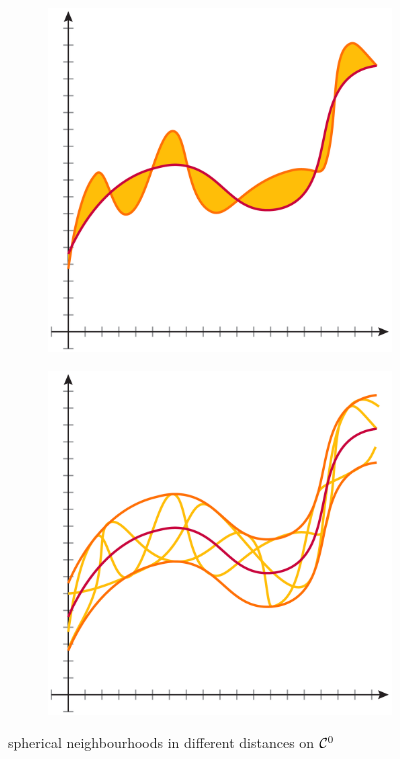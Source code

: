 \begin{figure}[h]
	\centering
	\begin{subfigure}[b]{.4\linewidth}
		\includegraphics[width=\linewidth]{images/Rec1_FunctionNorms-02}
	\end{subfigure}
	\hspace{.1\linewidth}
	\begin{subfigure}[b]{.4\linewidth}
		\includegraphics[width=\linewidth]{images/Rec1_FunctionNorms-01}
	\end{subfigure}
	\caption{spherical neighbourhoods in different distances on $\mathcal C^0$}
	\label{spherical-nbh-Cc0-different-distances}
\end{figure}

